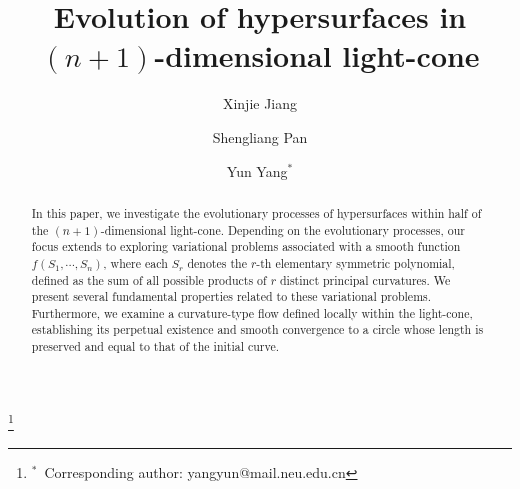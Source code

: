 \documentclass[reqno,11pt, letterpaper]{amsart}
\theoremstyle{plain}
\theoremstyle{definition}
\numberwithin{equation}{section}
\newcommand\blfootnote[1]{%
 \begingroup
 \renewcommand\thefootnote{}\footnote{#1}%
 \addtocounter{footnote}{-1}%
 \endgroup
 }
\begin{document}
\title[Evolution of hypersurfaces in $(n+1)$-dimensional light-cone]{Evolution of hypersurfaces in $(n+1)$-dimensional light-cone}

	\author[X. Jiang]{Xinjie Jiang}%
\address{Xinjie Jiang}

\author[S. Pan]{Shengliang Pan}%
\address{Shengliang Pan}

\address{
School of Mathematical Sciences, Key Laboratory of Intelligent Computing and Applications (Ministry of Education), Tongji University, No.1239, Siping Road, Shanghai, 200092, P. R. China}

    \author[Y. Yang]{Yun Yang${}^*$}\blfootnote{${}^*$~Corresponding author: yangyun@mail.neu.edu.cn}
    \address{ Yun Yang\newline\indent
     Department of Mathematics, Northeastern University, Shenyang, 110819, P.R. China}


\begin{abstract}
In this paper, we investigate the evolutionary processes of hypersurfaces within half of the $(n+1)$-dimensional light-cone. Depending on the evolutionary processes, our focus extends to exploring variational problems associated with a smooth function $f(S_1,\cdots,S_n)$, where each $S_r$ denotes the $r$-th elementary symmetric polynomial, defined as the sum of all possible products of $r$ distinct principal curvatures. We present several fundamental properties related to these variational problems. Furthermore, we examine a curvature-type flow defined locally within the light-cone, establishing its perpetual existence and smooth convergence to a circle whose length is preserved and equal to that of the initial curve.
\end{abstract}






\maketitle
\end{document}

